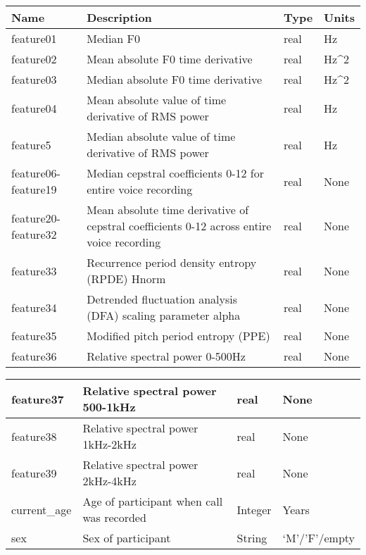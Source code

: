 
\begin{tabularx}{1\textwidth} { 
		| >{\raggedright\arraybackslash}X 
		| >{\raggedright\arraybackslash}X 
		| >{\raggedright\arraybackslash}X 
		| >{\raggedright\arraybackslash}X |}
	\hline
	\textbf{Name} & \textbf{Description} & \textbf{Type} & \textbf{Units} \\
	\hline
	feature01  & Median F0  & real & Hz  \\
	\hline
	feature02  & Mean absolute F0 time derivative  & real & Hz^2 \\
	\hline
	feature03  & Median absolute F0 time derivative  & real & Hz^2  \\
	\hline
	feature04  & Mean absolute value of time derivative of RMS power  & real & Hz  \\
	\hline
	feature5  &Median absolute value of time derivative of RMS power  & real & Hz  \\
	\hline
	feature06-feature19  & Median cepstral coefficients 0-12 for entire voice recording  & real & None  \\
	\hline
	feature20-feature32  & Mean absolute time derivative of cepstral coefficients 0-12 across entire voice recording  & real & None  \\
	\hline
	feature33  & Recurrence period density entropy (RPDE) Hnorm  & real & None  \\
	\hline
	feature34  & Detrended fluctuation analysis (DFA) scaling parameter alpha  & real & None  \\
	\hline
	feature35  & Modified pitch period entropy (PPE)  & real & None  \\
	\hline
	feature36  & Relative spectral power 0-500Hz  & real & None  \\
	\hline
\end{tabularx}

\begin{tabularx}{1\textwidth} { 
		| >{\raggedright\arraybackslash}X 
		| >{\raggedright\arraybackslash}X 
		| >{\raggedright\arraybackslash}X 
		| >{\raggedright\arraybackslash}X |}
	\hline
	feature37  & Relative spectral power 500-1kHz  & real & None  \\
	\hline
	feature38  & Relative spectral power 1kHz-2kHz  & real & None  \\
	\hline
	feature39  & Relative spectral power 2kHz-4kHz  & real & None  \\
	\hline
	current\_age  & Age of participant when call was recorded  & Integer & Years  \\
	\hline
	sex  & Sex of participant  & String & ‘M’/’F’/empty  \\
	\hline
\end{tabularx}

